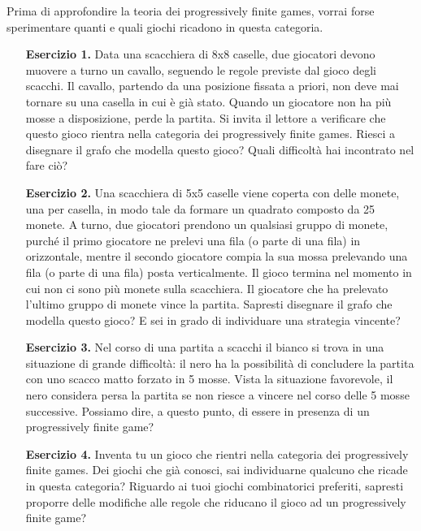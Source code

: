\documentclass[a4paper, 10pt]{report}
\theoremstyle{definition} %
\begin{document}
Prima di approfondire la teoria dei progressively finite games, vorrai forse
sperimentare quanti e quali giochi ricadono in questa categoria. 

\begin{enumerate}
\item[\textbf{Esercizio 1.}]   Data una scacchiera di 8x8 caselle, due
  giocatori devono muovere a turno un cavallo, seguendo le regole previste dal
  gioco degli scacchi. Il cavallo, partendo da una posizione fissata a priori,
  non deve mai tornare su una casella in cui \`e gi\`a stato. Quando un
  giocatore non ha pi\`u mosse a disposizione, perde la partita. Si invita il
  lettore a verificare che questo gioco rientra nella categoria dei
  progressively finite games. Riesci a disegnare il grafo che modella questo
  gioco? Quali difficolt\`a hai incontrato nel fare ci\`o? 
\item[\textbf{Esercizio 2.}] Una scacchiera di 5x5 caselle viene coperta con
  delle monete, una per casella, in modo tale da formare un quadrato composto
  da 25 monete. A turno, due giocatori prendono un qualsiasi gruppo di
  monete, purch\'e il primo giocatore ne prelevi una fila (o parte di una
  fila) in orizzontale, mentre il secondo giocatore compia la sua mossa
  prelevando una fila (o parte di una fila) posta verticalmente. Il gioco
  termina nel momento in cui non ci sono pi\`u monete sulla scacchiera. Il
  giocatore che ha prelevato l'ultimo gruppo di monete vince la
  partita. Sapresti disegnare il grafo che modella questo gioco? E sei in
  grado di individuare una strategia vincente?
\item[\textbf{Esercizio 3.}] Nel corso di una partita a scacchi il bianco si
  trova in una situazione di grande difficolt\`a: il nero ha la possibilit\`a
  di concludere la partita con uno scacco matto forzato in 5 mosse. Vista la
  situazione favorevole, il nero considera persa la partita se non riesce a
  vincere nel corso delle 5 mosse successive. Possiamo dire, a questo punto,
  di essere in presenza di un progressively finite game?
\item[\textbf{Esercizio 4.}] Inventa tu un gioco che rientri nella categoria
  dei progressively finite games. Dei giochi che gi\`a conosci, sai
  individuarne qualcuno che ricade in questa categoria? Riguardo ai tuoi
  giochi combinatorici preferiti, sapresti proporre delle modifiche alle
  regole che riducano il gioco ad un progressively finite game?

\end{enumerate}
\end{document}
